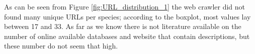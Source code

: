 \documentclass[a4paper, 12pt, oneside]{book} %
\begin{document}
As can be seen from Figure \ref{fig:URL_distribution_1} the web crawler did not found many unique URLs per species; according to the boxplot, most values lay between 17 and 33.
As far as we know there is not literature available on the number of online available databases and website that contain descriptions, but these number do not seem that high.
\end{document}
